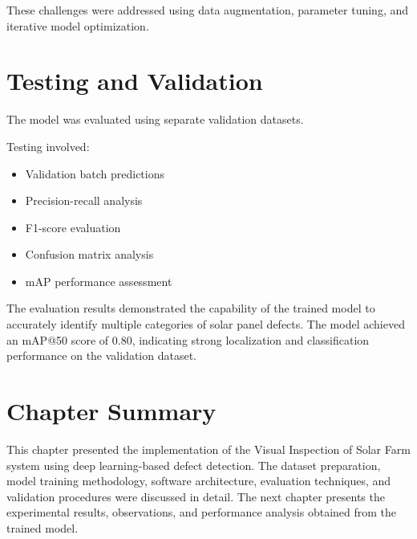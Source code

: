 These challenges were addressed using data augmentation, parameter tuning, and iterative model optimization.

\section{Testing and Validation}

The model was evaluated using separate validation datasets.

Testing involved:

\begin{itemize}
\item Validation batch predictions
\item Precision-recall analysis
\item F1-score evaluation
\item Confusion matrix analysis
\item mAP performance assessment
\end{itemize}

The evaluation results demonstrated the capability of the trained model to accurately identify multiple categories of solar panel defects. The model achieved an mAP@50 score of 0.80, indicating strong localization and classification performance on the validation dataset.

\section{Chapter Summary}

This chapter presented the implementation of the Visual Inspection of Solar Farm system using deep learning-based defect detection. The dataset preparation, model training methodology, software architecture, evaluation techniques, and validation procedures were discussed in detail. The next chapter presents the experimental results, observations, and performance analysis obtained from the trained model.
